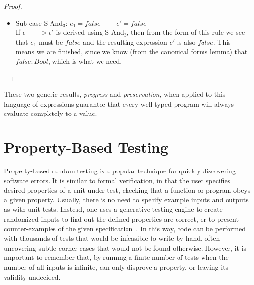 \documentclass[tese,capa,english]{texufpel}
\begin{document}
\begin{proof}
\begin{itemize}
\begin{itemize}
\item Sub-case {\footnotesize\textrm{S-And$_3$}}: $e_1 = false$ \ \ \ \ $e' = false$ \vspace{4pt} \\
If $e --> e'$ is derived using {\footnotesize\textrm{S-And$_3$}}, then from the form of this rule we see that $e_1$ must be $false$ and the resulting expression $e'$ is also $false$. This means we are finished, since we know (from the canonical forms lemma) that $false : Bool$, which is what we need.
\end{itemize}
\end{itemize}
\vspace{-3ex}
\end{proof}

These two generic results, \emph{progress} and \emph{preservation}, when applied to this language of expressions guarantee that every well-typed program will always evaluate completely to a value. 

\section{Property-Based Testing}
\label{sec:pbt}
















Property-based random testing is a popular technique for quickly discovering software errors. It is similar to formal verification, in that the user specifies desired properties of a unit under test, checking that a function or program obeys a given property. Usually, there is no need to specify example inputs and outputs as with unit tests. Instead, one uses a generative-testing engine to create randomized inputs to find out the defined properties are correct, or to present counter-examples of the given specification~\cite{Lampropoulos:2017:GGG:3177123.3158133}. In this way, code can be performed with thousands of tests that would be infeasible to write by hand, often uncovering subtle corner cases that would not be found otherwise. However, it is important to remember that, by running a finite number of tests when the number of all inputs is infinite, can only disprove a property, or leaving its validity undecided. 
\end{document}
